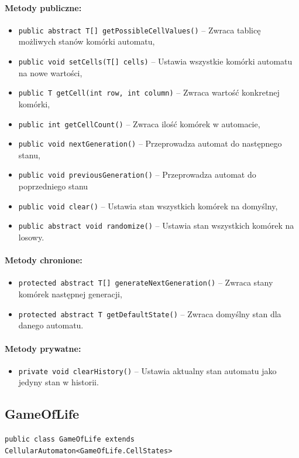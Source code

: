 \documentclass{report}
\begin{document}
\paragraph{Metody publiczne:}
\begin{itemize}
	\item \texttt{public abstract T[] getPossibleCellValues()} -- Zwraca tablicę możliwych stanów komórki automatu,
	\item \texttt{public void setCells(T[] cells)} -- Ustawia wszystkie komórki automatu na nowe wartości,
	\item \texttt{public T getCell(int row, int column)} -- Zwraca wartość konkretnej komórki,
	\item \texttt{public int getCellCount()} -- Zwraca ilość komórek w automacie,
	\item \texttt{public void nextGeneration()} -- Przeprowadza automat do następnego stanu,
	\item \texttt{public void previousGeneration()} -- Przeprowadza automat do poprzedniego stanu
	\item \texttt{public void clear()} -- Ustawia stan wszystkich komórek na domyślny,
	\item \texttt{public abstract void randomize()} -- Ustawia stan wszystkich komórek na losowy.
\end{itemize}

\paragraph{Metody chronione:}
\begin{itemize}
	\item \texttt{protected abstract T[] generateNextGeneration()} -- Zwraca stany komórek następnej generacji,
	\item \texttt{protected abstract T getDefaultState()} -- Zwraca domyślny stan dla danego automatu.
\end{itemize}

\paragraph{Metody prywatne:}
\begin{itemize}
	\item \texttt{private void clearHistory()} -- Ustawia aktualny stan automatu jako jedyny stan w historii.
\end{itemize}

\subsection{GameOfLife}
\texttt{public class GameOfLife extends CellularAutomaton<GameOfLife.CellStates>}
\end{document}
